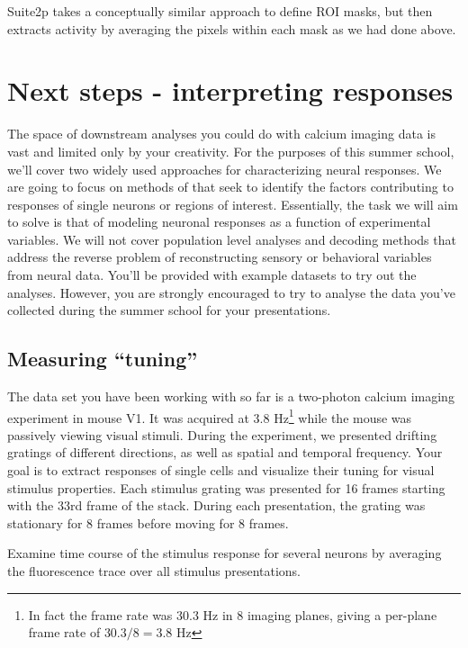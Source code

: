 \documentclass[a4paper]{report}
\newcommand{\nexercise}[0]{\arabic{exercises}\addtocounter{exercises}{1}}
\begin{document}
Suite2p takes a conceptually similar approach to define ROI masks, but then extracts activity by averaging the pixels within each mask as we had done above.

\section{Next steps - interpreting responses}
The space of downstream analyses you could do with calcium imaging data is vast and limited only by your creativity. 
For the purposes of this summer school, we'll cover two widely used approaches for characterizing neural responses. 
We are going to focus on methods of that seek to identify the factors contributing to responses of single neurons or regions of interest. 
Essentially, the task we will aim to solve is that of modeling neuronal responses as a function of experimental variables. 
We will not cover population level analyses and decoding methods that address the reverse problem of reconstructing sensory or behavioral variables from neural data. 
You'll be provided with example datasets to try out the analyses. However, you are strongly encouraged to try to analyse the data you've collected during the summer school for your presentations.

\subsection{Measuring ``tuning''}
The data set you have been working with so far is a two-photon calcium imaging experiment in mouse V1. 
It was acquired at 3.8 Hz\footnote{In fact the frame rate was 30.3 Hz in 8 imaging planes, giving a per-plane frame rate of $30.3/8 = 3.8$ Hz} while the mouse was passively viewing visual stimuli.
During the experiment, we presented drifting gratings of different directions, as well as spatial and temporal frequency.
Your goal is to extract responses of single cells and visualize their tuning for visual stimulus properties. 
Each stimulus grating was presented for 16 frames starting with the 33rd frame of the stack.
During each presentation, the grating was stationary for 8 frames before moving for 8 frames.

\begin{exercisebox}[frametitle={Exercise \nexercise: Mean response time course}]
Examine time course of the stimulus response for several neurons by averaging the fluorescence trace over all stimulus presentations.
\end{exercisebox}
\end{document}
